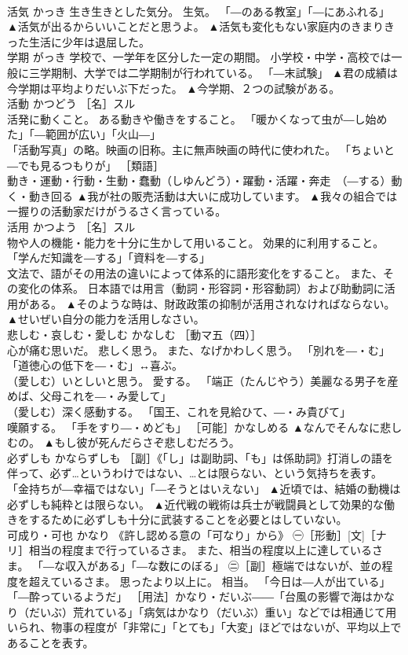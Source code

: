 \documentclass[8pt]{extreport}
\begin{document}
\begin{CJK}{UTF8}{min}
\\	活気	かっき	生き生きとした気分。 生気。 「―のある教室」「―にあふれる」	▲活気が出るからいいことだと思うよ。 ▲活気も変化もない家庭内のきまりきった生活に少年は退屈した。
\\	学期	がっき	学校で、一学年を区分した一定の期間。 小学校・中学・高校では一般に三学期制、大学では二学期制が行われている。 「―末試験」	▲君の成績は今学期は平均よりだいぶ下だった。 ▲今学期、２つの試験がある。
\\	活動	かつどう	［名］スル 
\\	活発に動くこと。 ある動きや働きをすること。 「暖かくなって虫が―し始めた」「―範囲が広い」「火山―」 
\\	「活動写真」の略。映画の旧称。主に無声映画の時代に使われた。 「ちょいと―でも見るつもりが」 ［類語］
\\	動き・運動・行動・生動・蠢動（しゆんどう）・躍動・活躍・奔走　（―する）動く・動き回る	▲我が社の販売活動は大いに成功しています。 ▲我々の組合では一握りの活動家だけがうるさく言っている。
\\	活用	かつよう	［名］スル 
\\	物や人の機能・能力を十分に生かして用いること。 効果的に利用すること。 「学んだ知識を―する」「資料を―する」 
\\	文法で、語がその用法の違いによって体系的に語形変化をすること。 また、その変化の体系。 日本語では用言（動詞・形容詞・形容動詞）および助動詞に活用がある。	▲そのような時は、財政政策の抑制が活用されなければならない。 ▲せいぜい自分の能力を活用しなさい。
\\	悲しむ・哀しむ・愛しむ	かなしむ	［動マ五（四）］ 
\\	心が痛む思いだ。 悲しく思う。 また、なげかわしく思う。 「別れを―・む」「道徳心の低下を―・む」↔喜ぶ。 
\\	（愛しむ）いとしいと思う。 愛する。 「端正（たんじやう）美麗なる男子を産めば、父母これを―・み愛して」 
\\	（愛しむ）深く感動する。 「国王、これを見給ひて、―・み貴びて」 
\\	嘆願する。 「手をすり―・めども」 ［可能］かなしめる	▲なんでそんなに悲しむの。 ▲もし彼が死んだらさぞ悲しむだろう。
\\	必ずしも	かならずしも	［副］《「し」は副助詞、「も」は係助詞》打消しの語を伴って、必ず…というわけではない、…とは限らない、という気持ちを表す。 「金持ちが―幸福ではない」「―そうとはいえない」	▲近頃では、結婚の動機は必ずしも純粋とは限らない。 ▲近代戦の戦術は兵士が戦闘員として効果的な働きをするために必ずしも十分に武装することを必要とはしていない。
\\	可成り・可也	かなり	《許し認める意の「可なり」から》 ㊀［形動］[文]［ナリ］相当の程度まで行っているさま。 また、相当の程度以上に達しているさま。 「―な収入がある」「―な数にのぼる」 ㊁［副］極端ではないが、並の程度を超えているさま。 思ったより以上に。 相当。 「今日は―人が出ている」「―酔っているようだ」 ［用法］かなり・だいぶ――「台風の影響で海はかなり（だいぶ）荒れている」「病気はかなり（だいぶ）重い」などでは相通じて用いられ、物事の程度が「非常に」「とても」「大変」ほどではないが、平均以上であることを表す。 

\end{CJK}
\end{document}
